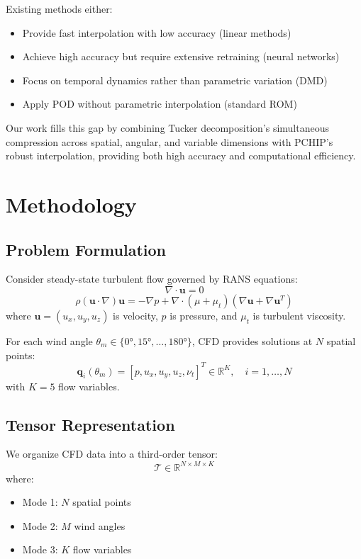 \documentclass[conference]{IEEEtran}
\begin{document}
Existing methods either:
\begin{itemize}
    \item Provide fast interpolation with low accuracy (linear methods)
    \item Achieve high accuracy but require extensive retraining (neural networks)
    \item Focus on temporal dynamics rather than parametric variation (DMD)
    \item Apply POD without parametric interpolation (standard ROM)
\end{itemize}

Our work fills this gap by combining Tucker decomposition's simultaneous compression across spatial, angular, and variable dimensions with PCHIP's robust interpolation, providing both high accuracy and computational efficiency.

\section{Methodology}

\subsection{Problem Formulation}

Consider steady-state turbulent flow governed by RANS equations:
\begin{equation}
\nabla \cdot \mathbf{u} = 0
\end{equation}
\begin{equation}
\rho (\mathbf{u} \cdot \nabla) \mathbf{u} = -\nabla p + \nabla \cdot (\mu + \mu_t)(\nabla \mathbf{u} + \nabla \mathbf{u}^T)
\end{equation}
where $\mathbf{u} = (u_x, u_y, u_z)$ is velocity, $p$ is pressure, and $\mu_t$ is turbulent viscosity.

For each wind angle $\theta_m \in \{0°, 15°, \ldots, 180°\}$, CFD provides solutions at $N$ spatial points:
\begin{equation}
\mathbf{q}_i(\theta_m) = [p, u_x, u_y, u_z, \nu_t]^T \in \mathbb{R}^K, \quad i = 1, \ldots, N
\end{equation}
with $K=5$ flow variables.

\subsection{Tensor Representation}

We organize CFD data into a third-order tensor:
\begin{equation}
\mathcal{T} \in \mathbb{R}^{N \times M \times K}
\end{equation}
where:
\begin{itemize}
    \item Mode 1: $N$ spatial points
    \item Mode 2: $M$ wind angles
    \item Mode 3: $K$ flow variables
\end{itemize}
\end{document}
